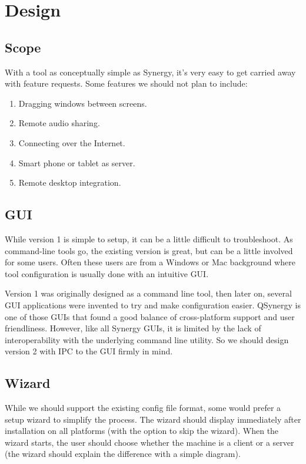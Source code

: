 \section{Design}

\subsection{Scope}

With a tool as conceptually simple as Synergy, it's very easy to get carried
away with feature requests. Some features we should not plan to include:

\begin{enumerate}
  \item Dragging windows between screens.
  \item Remote audio sharing.
  \item Connecting over the Internet.
  \item Smart phone or tablet as server.
  \item Remote desktop integration.
\end{enumerate}

\subsection{GUI}

While version 1 is simple to setup, it can be a little difficult to
troubleshoot. As command-line tools go, the existing version is great, but
can be a little involved for some users. Often these users are from a Windows
or Mac background where tool configuration is usually done with an intuitive
GUI.

Version 1 was originally designed as a command line tool, then later on, several
GUI applications were invented to try and make configuration easier. QSynergy is
one of those GUIs that found a good balance of cross-platform support and user 
friendliness. However, like all Synergy GUIs, it is limited by the lack of 
interoperability with the underlying command line utility. So we should design 
version 2 with IPC to the GUI firmly in mind.

\subsection{Wizard}

While we should support the existing config file format, some would prefer a
setup wizard to simplify the process. The wizard should display immediately
after installation on all platforms (with the option to skip the wizard). When
the wizard starts, the user should choose whether the machine is a client or a
server (the wizard should explain the difference with a simple diagram).

